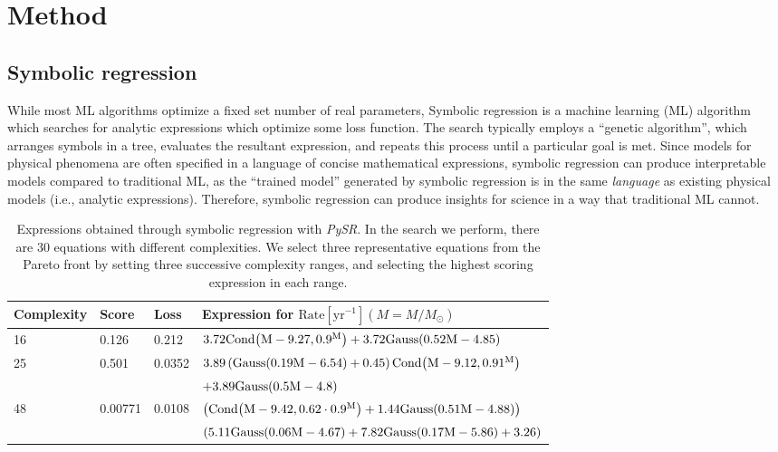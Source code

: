 \documentclass[nohyperref]{article}
\newcommand\pysr{\textit{PySR}\xspace}
\theoremstyle{plain}
\theoremstyle{definition}
\theoremstyle{remark}
\begin{document}
\section{Method}
\label{sec:method}

\subsection{Symbolic regression}

While most ML algorithms optimize a fixed set number of real parameters,
Symbolic regression is a machine learning (ML) algorithm which searches for analytic expressions which optimize some loss function.
The search typically employs a ``genetic algorithm'', which arranges symbols in a tree, evaluates the resultant expression, and repeats this process until a particular goal is met.
Since models for physical phenomena are often specified in a language of concise mathematical expressions, symbolic regression can produce interpretable models compared to traditional ML, as the ``trained model'' generated by symbolic regression is in the same \textit{language} as existing physical models (i.e., analytic expressions).
Therefore, symbolic regression can produce insights for science in a way that traditional ML cannot.

\begin{table*}[hbt!]
    \begin{center}
    \begin{tabular}{ l l l l }
    \hline
    \hline
    Complexity &  Score & Loss & Expression for $\text{Rate}[\text{yr}^{-1}](M=M/M_\odot)$\\
    \hline
    \hline
    16 & 0.126   & 0.212  & $3.72 \rm{Cond}{\left(M - 9.27,0.9^{M} \right)} + 3.72 \rm{Gauss}{\left(0.52 M - 4.85 \right)}$\\[0.4em]
    25 & 0.501   & 0.0352 & $3.89 \left(\rm{Gauss}{\left(0.19 M - 6.54 \right)} + 0.45\right) \rm{Cond}{\left(M - 9.12,0.91^{M} \right)}$\\
    & & & $ + 3.89 \rm{Gauss}{\left(0.5 M - 4.8 \right)}$\\[0.4em]
    48 & 0.00771 & 0.0108 & $\left(\rm{Cond}{\left(M - 9.42,0.62 \cdot 0.9^{M} \right)} + 1.44 \rm{Gauss}{\left(0.51 M - 4.88 \right)}\right)$\\
    & & & $\left(5.11 \rm{Gauss}{\left(0.06 M - 4.67 \right)} + 7.82 \rm{Gauss}{\left(0.17 M - 5.86 \right)} + 3.26\right)$\\
    \hline
    \hline
    \end{tabular}
    \caption{Expressions obtained through symbolic regression with \pysr.
    In the search we perform, there are 30 equations with different complexities.
    We select three representative equations from the Pareto front by setting three successive complexity ranges, and selecting the highest scoring expression in each range.}
    \label{tab:equations}
    \end{center}
\end{table*}
\end{document}
